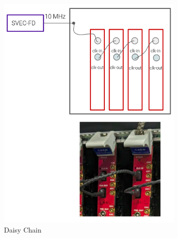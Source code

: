 \begin{figure}[htbp!]
\begin{subfigure}[h]{0.49\linewidth}
\centering    
\includegraphics[width=\linewidth]{daisychain}
\caption{Daisy Chain}
\end{subfigure}
\hfill
\begin{subfigure}[h]{0.49\linewidth}
\centering    

\end{subfigure}
\end{figure}
